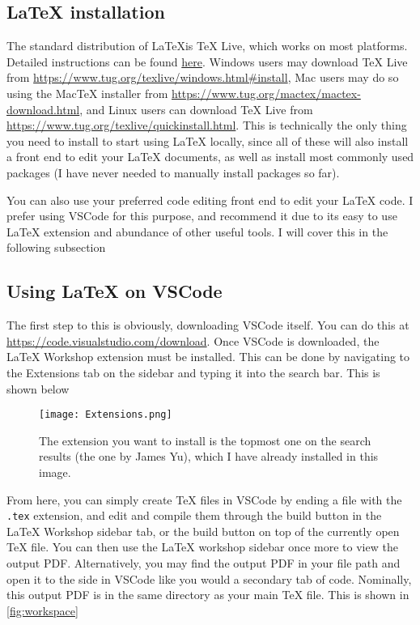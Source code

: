 \graphicspath{{Parts/2_Installation/graphics/}}
\subsection{\LaTeX{} installation}

The standard distribution of \LaTeX is TeX Live, which works on most platforms. Detailed instructions can be found \hyperlink{https://www.tug.org/texlive/}{here}. Windows users may download TeX Live from \url{https://www.tug.org/texlive/windows.html#install}, Mac users may do so using the MacTeX installer from \url{https://www.tug.org/mactex/mactex-download.html}, and Linux users can download TeX Live from \url{https://www.tug.org/texlive/quickinstall.html}. This is technically the only thing you need to install to start using \LaTeX{} locally, since all of these will also install a front end to edit your \LaTeX{} documents, as well as install most commonly used packages (I have never needed to manually install packages so far).

You can also use your preferred code editing front end to edit your \LaTeX{} code. I prefer using VSCode for this purpose, and recommend it due to its easy to use \LaTeX{} extension and abundance of other useful tools. I will cover this in the following subsection


\subsection{Using \LaTeX{} on VSCode}

The first step to this is obviously, downloading VSCode itself. You can do this at \url{https://code.visualstudio.com/download}. Once VSCode is downloaded, the LaTeX Workshop extension must be installed. This can be done by navigating to the Extensions tab on the sidebar and typing it into the search bar. This is shown below
\begin{figure}[ht!]
    \centering
    \texttt{[image: Extensions.png]}
    \caption{The extension you want to install is the topmost one on the search results (the one by James Yu), which I have already installed in this image.}
\end{figure}

From here, you can simply create TeX files in VSCode by ending a file with the \verb|.tex| extension, and edit and compile them through the build button in the LaTeX Workshop sidebar tab, or the build button on top of the currently open TeX file. You can then use the LaTeX workshop sidebar once more to view the output PDF. Alternatively, you may find the output PDF in your file path and open it to the side in VSCode like you would a secondary tab of code. Nominally, this output PDF is in the same directory as your main TeX file. This is shown in \cref{fig:workspace}

